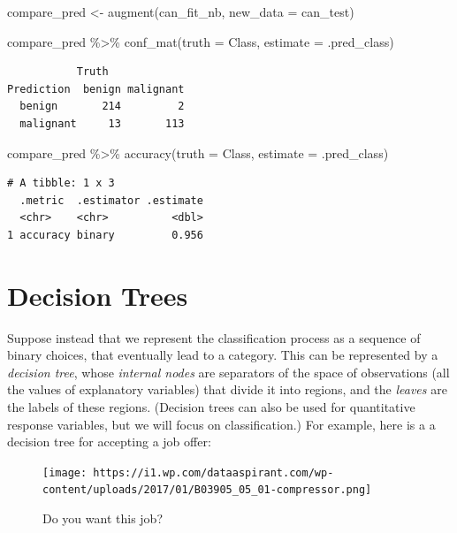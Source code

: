 \documentclass[
  letterpaper,
  DIV=11,
  numbers=noendperiod]{scrreprt}
\newenvironment{Shaded}{\begin{snugshade}}{\end{snugshade}}
\newcommand{\AttributeTok}[1]{\textcolor[rgb]{0.40,0.45,0.13}{#1}}
\newcommand{\FunctionTok}[1]{\textcolor[rgb]{0.28,0.35,0.67}{#1}}
\newcommand{\NormalTok}[1]{\textcolor[rgb]{0.00,0.23,0.31}{#1}}
\newcommand{\OtherTok}[1]{\textcolor[rgb]{0.00,0.23,0.31}{#1}}
\newcommand{\SpecialCharTok}[1]{\textcolor[rgb]{0.37,0.37,0.37}{#1}}
\begin{document}
\begin{Shaded}
\begin{Highlighting}[]
\NormalTok{compare\_pred }\OtherTok{\textless{}{-}} \FunctionTok{augment}\NormalTok{(can\_fit\_nb, }\AttributeTok{new\_data =}\NormalTok{ can\_test) }

\NormalTok{compare\_pred }\SpecialCharTok{\%\textgreater{}\%} \FunctionTok{conf\_mat}\NormalTok{(}\AttributeTok{truth =}\NormalTok{ Class, }\AttributeTok{estimate =}\NormalTok{ .pred\_class)}
\end{Highlighting}
\end{Shaded}

\begin{verbatim}
           Truth
Prediction  benign malignant
  benign       214         2
  malignant     13       113
\end{verbatim}

\begin{Shaded}
\begin{Highlighting}[]
\NormalTok{compare\_pred }\SpecialCharTok{\%\textgreater{}\%}  \FunctionTok{accuracy}\NormalTok{(}\AttributeTok{truth =}\NormalTok{ Class, }\AttributeTok{estimate =}\NormalTok{ .pred\_class)}
\end{Highlighting}
\end{Shaded}

\begin{verbatim}
# A tibble: 1 x 3
  .metric  .estimator .estimate
  <chr>    <chr>          <dbl>
1 accuracy binary         0.956
\end{verbatim}

\hypertarget{decision-trees}{%
\section{Decision Trees}\label{decision-trees}}

Suppose instead that we represent the classification process as a
sequence of binary choices, that eventually lead to a category. This can
be represented by a \emph{decision tree}, whose \emph{internal nodes}
are separators of the space of observations (all the values of
explanatory variables) that divide it into regions, and the
\emph{leaves} are the labels of these regions. (Decision trees can also
be used for quantitative response variables, but we will focus on
classification.) For example, here is a a decision tree for accepting a
job offer:

\begin{figure}

{\centering \texttt{[image: https://i1.wp.com/dataaspirant.com/wp-content/uploads/2017/01/B03905\_05\_01-compressor.png]}

}

\caption{Do you want this job?}

\end{figure}
\end{document}
